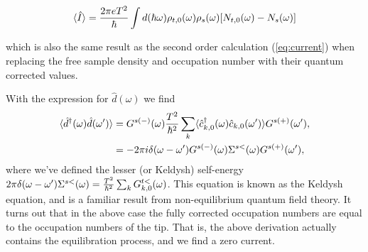 \begin{tcolorbox}[colback=gray!20!white]
\begin{equation}
    \langle\hat{I}\rangle= \frac{2\pi e T^2}{\hbar}\int d(\hbar\omega)\rho_{t,0}(\omega)\rho_s(\omega)[N_{t,0}(\omega)-N_s(\omega)]
\end{equation}
\end{tcolorbox}
which is also the same result as the second order calculation (\autoref{eq:current}) when replacing the free sample density and occupation number with their quantum corrected values.

With the expression for $\hat{d}(\omega)$ we find
\begin{align}
    \langle \hat{d}^\dagger(\omega) \hat{d}(\omega')\rangle &= G^{s(-)}(\omega)\frac{T^2}{\hbar^2}\sum_k \langle\hat{c}^\dagger_{k,0}(\omega)\hat{c}_{k,0}(\omega')\rangle G^{s(+)}(\omega'),\nonumber\\
    &=-2\pi i \delta(\omega-\omega')G^{s(-)}(\omega)\Sigma^{s<}(\omega)G^{s(+)}(\omega'),
\end{align}
where we've defined the lesser (or Keldysh) self-energy $2\pi\delta(\omega-\omega')\Sigma^{s<}(\omega) = \frac{T^2}{\hbar^2}\sum_k G_{k,0}^{t<}(\omega)$. This equation is known as the Keldysh equation, and is a familiar result from non-equilibrium quantum field theory. It turns out that in the above case the fully corrected occupation numbers are equal to the occupation numbers of the tip. That is, the above derivation actually contains the equilibration process, and we find a zero current.
